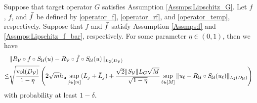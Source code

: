 \documentclass[10pt,a4paper]{amsart}
\newcommand{\Uc}{\mathcal{U}}
\newcommand{\Vc}{\mathcal{V}}
\newcommand{\ub}{\mathbf{u}}
\newcommand{\vol}{\mathop{\mathrm{vol}}}
\begin{document}
\begin{lemma}
\label{operator_lemma2}
Suppose that target operator $G$ satisfies Assumption \ref{Assmps:Lipschitz_G}. Let $f$, $\hat{f}$, and $\Bar{f}$ be defined by \eqref{operator_f}, \eqref{operator_rf}, and  \eqref{operator_temp}, respectively. Suppose that $f$ and $\Bar{f}$ satisfy Assumption \ref{Assmps:f} and \ref{Assmps:Lipschitz_f_bar}, respectively. For some parameter $\eta\in(0,1)$, then we have
\begin{equation*}
\begin{aligned}
& \|R_\Vc \circ f \circ S_\Uc(u) - R_\Vc \circ \Hat{f} \circ S_\Uc(u) \|_{L_2(D_\Vc)} \\
\leq & \sqrt{\frac{\vol(D_\Vc)}{1-\eta}} \left( 2\sqrt{m}h_\ub\sup_{j\in[m]}(L_j+\Bar{L}_j) + \frac{\sqrt{2}\|S_\Vc\| L_G\sqrt{M}}{\sqrt{1-\eta}} \sup_{\ell\in[M]}\| u_\ell - R_\Uc\circ S_\Uc(u_\ell)\|_{L_2(D_\Uc)} \right)
\end{aligned}
\end{equation*}
with probability at least $1-\delta$. 
\end{lemma}
\end{document}
